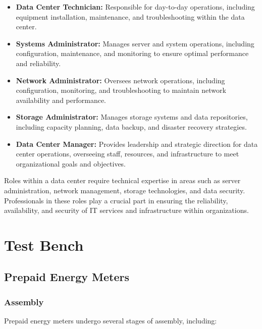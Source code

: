 \documentclass[a4paper,12pt]{report}
\begin{document}
	\begin{itemize}
		\item \textbf{Data Center Technician:} Responsible for day-to-day operations, including equipment installation, maintenance, and troubleshooting within the data center.
		\item \textbf{Systems Administrator:} Manages server and system operations, including configuration, maintenance, and monitoring to ensure optimal performance and reliability.
		\item \textbf{Network Administrator:} Oversees network operations, including configuration, monitoring, and troubleshooting to maintain network availability and performance.
		\item \textbf{Storage Administrator:} Manages storage systems and data repositories, including capacity planning, data backup, and disaster recovery strategies.
		\item \textbf{Data Center Manager:} Provides leadership and strategic direction for data center operations, overseeing staff, resources, and infrastructure to meet organizational goals and objectives.
	\end{itemize}
	
	Roles within a data center require technical expertise in areas such as server administration, network management, storage technologies, and data security. Professionals in these roles play a crucial part in ensuring the reliability, availability, and security of IT services and infrastructure within organizations.
	
	
	
	\section{Test Bench}
	
	\subsection{Prepaid Energy Meters}
	
	\subsubsection{Assembly}
	Prepaid energy meters undergo several stages of assembly, including:
	
\end{document}
